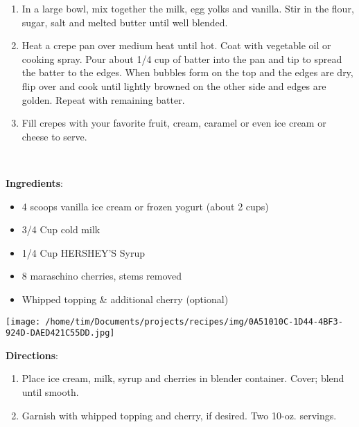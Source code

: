 \documentclass[11pt, twoside, openany]{book}
\begin{document}
\vspace{-3mm}\begin{enumerate}\setlength\itemsep{-1mm}
\item In a large bowl, mix together the milk, egg yolks and vanilla. Stir in the flour, sugar, salt and melted butter until well blended.
\item Heat a crepe pan over medium heat until hot. Coat with vegetable oil or cooking spray. Pour about 1/4 cup of batter into the pan and tip to spread the batter to the edges. When bubbles form on the top and the edges are dry, flip over and cook until lightly browned on the other side and edges are golden. Repeat with remaining batter.
\item Fill crepes with your favorite fruit, cream, caramel or even ice cream or cheese to serve.
\end{enumerate}
 \label{chocolate-cherry-milkshake}\hfill\textit{}\\
\begin{minipage}[t]{0.8\linewidth}
\textbf{Ingredients}:\vspace{-3mm}
\begin{multicols}{2}
\begin{itemize}\setlength\itemsep{-1mm}
\item 4 scoops vanilla ice cream or frozen yogurt (about 2 cups)
\item 3/4 Cup cold milk
\item 1/4 Cup HERSHEY'S Syrup
\item 8 maraschino cherries, stems removed
\item Whipped topping & additional cherry (optional)
\end{itemize}
\end{multicols}
\end{minipage}
\begin{minipage}[t]{0.2\linewidth}
\centering \strut\vspace*{-\baselineskip}\newline
\texttt{[image: /home/tim/Documents/projects/recipes/img/0A51010C-1D44-4BF3-924D-DAED421C55DD.jpg]}\\
\end{minipage}\vspace{3mm}
\textbf{Directions}:
\vspace{-3mm}\begin{enumerate}\setlength\itemsep{-1mm}
\item Place ice cream, milk, syrup and cherries in blender container. Cover; blend until smooth.
\item Garnish with whipped topping and cherry, if desired. Two 10-oz. servings.
\end{enumerate}
\end{document}
